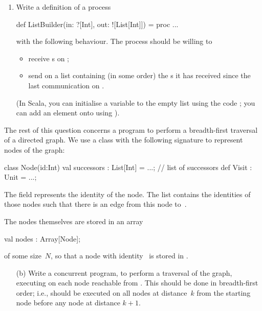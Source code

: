 \begin{question}
\begin{enumerate}
\item
Write a definition of a process
%
\begin{scala}
def ListBuilder(in: ?[Int], out: ![List[Int]]) = proc{ ... }
\end{scala}
%
with the following behaviour.  The process should be willing to 
%
\begin{itemize}
\item
receive s on ;

\item
send on  a list containing (in some order) the s it has
received since the last communication on .
\end{itemize}
%
(In Scala, you can initialise a variable  to the empty list using
the code ; you can add an element  onto
 using ).  
\end{enumerate}

\medskip

\noindent
The rest of this question concerns a program to perform a breadth-first
traversal of a directed graph.  We use a class with the following signature to
represent nodes of the graph:
%
\begin{scala}
class Node(id:Int){
  val successors : List[Int] = ...; // list of successors
  def Visit : Unit = ...;
}
\end{scala}
%
The field  represents the identity of the node.  The list
 contains the identities of those nodes  such
that there is an edge from this node to~.  

The nodes themselves are stored in an array
%
\begin{scala}
val nodes : Array[Node];
\end{scala}
%
of some size~$N$, so that a node with identity~ is stored in
.


\begin{enumerate}
\item[(b)]  
%
Write a concurrent program, to perform a traversal of the graph, executing
 on each node reachable from .  This should be
done in breadth-first order; i.e.,  should be executed on all
nodes at distance~$k$ from the starting node before any node at distance
$k+1$.


\end{enumerate}
\end{question}
